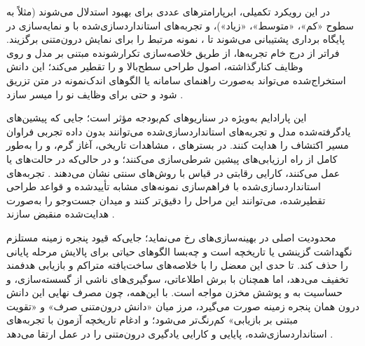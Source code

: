 در این رویکرد تکمیلی، ابرپارامترهای عددی برای بهبود استدلال  می‌شوند (مثلاً به سطوح «کم»، «متوسط»، «زیاد»)، و تجربه‌های استانداردسازی‌شده با  و نمایه‌سازی در پایگاه برداری پشتیبانی می‌شوند تا ،  نمونه مرتبط را برای نمایش درون‌متنی برگزیند. فراتر از درج خام تجربه‌ها،  از طریق خلاصه‌سازی تکرارشونده مبتنی بر مدل و  روی وظایف کنارگذاشته، اصول طراحی سطح‌بالا و  را تقطیر می‌کند؛ این دانش استخراج‌شده می‌تواند به‌صورت راهنمای سامانه یا الگوهای اندک‌نمونه در متن تزریق شود و حتی  برای وظایف نو را میسر سازد \cite{zhang-etal-2024-MLCopilot}.

این پارادایم به‌ویژه در سناریوهای کم‌بودجه مؤثر است؛ جایی که پیشین‌های یادگرفته‌شده مدل و تجربه‌های استانداردسازی‌شده می‌توانند بدون داده تجربی فراوان مسیر اکتشاف را هدایت کنند. در بسترهای ، مشاهدات تاریخی، آغاز گرم،  و  را به‌طور کامل از راه  ارزیابی‌های پیشین شرطی‌سازی می‌کنند؛ و در حالی‌که در حالت‌های  یا  عمل می‌کنند، کارایی رقابتی در قیاس با روش‌های سنتی نشان می‌دهند \cite{liu2024LLAMBO}. تجربه‌های استانداردسازی‌شده با فراهم‌سازی نمونه‌های مشابه تأییدشده و قواعد طراحی تقطیرشده، می‌توانند این مراحل را دقیق‌تر  کنند و میدان جست‌وجو را به‌صورت هدایت‌شده منقبض سازند \cite{zhang-etal-2024-MLCopilot}.

محدودیت اصلی در بهینه‌سازی‌های  رخ می‌نماید؛ جایی‌که قیود پنجره زمینه مستلزم نگهداشت گزینشی یا  تاریخچه است و چه‌بسا الگوهای حیاتی برای پالایش مرحله پایانی را حذف کند.  تا حدی این معضل را با خلاصه‌های ساخت‌یافته متراکم و بازیابی هدفمند  تخفیف می‌دهد، اما همچنان با برش اطلاعاتی، سوگیری‌های ناشی از گسسته‌سازی، و حساسیت به  و پوشش مخزن مواجه است. با این‌همه، چون مصرف نهایی این دانش درون همان پنجره زمینه صورت می‌گیرد، مرز میان «دانش درون‌متنی صرف» و «تقویت مبتنی بر بازیابی» کم‌رنگ‌تر می‌شود؛ و ادغام تاریخچه آزمون با تجربه‌های استانداردسازی‌شده، پایایی و کارایی یادگیری درون‌متنی را در عمل ارتقا می‌دهد \cite{zhang2023usingLLMforHPO, zheng2023GENIUS, chen2023Evoprompting, liu2024LLAMBO, zhang-etal-2024-MLCopilot}.

